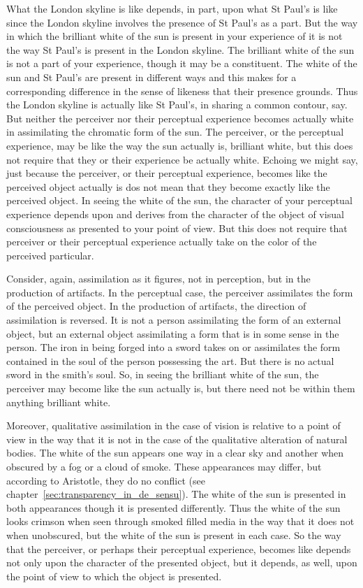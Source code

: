 What the London skyline is like depends, in part, upon what St Paul's is like since the London skyline involves the presence of St Paul's as a part. But the way in which the brilliant white of the sun is present in your experience of it is not the way St Paul's is present in the London skyline. The brilliant white of the sun is not a part of your experience, though it may be a constituent. The white of the sun and St Paul's are present in different ways and this makes for a corresponding difference in the sense of likeness that their presence grounds. Thus the London skyline is actually like St Paul's, in sharing a common contour, say. But neither the perceiver nor their perceptual experience becomes actually white in assimilating the chromatic form of the sun. The perceiver, or the perceptual experience, may be like the way the sun actually is, brilliant white, but this does not require that they or their experience be actually white. Echoing \citet{Austin:1962lr} we might say, just because the perceiver, or their perceptual experience, becomes like the perceived object actually is dos not mean that they become exactly like the perceived object. In seeing the white of the sun, the character of your perceptual experience depends upon and derives from the character of the object of visual consciousness as presented to your point of view. But this does not require that perceiver or their perceptual experience actually take on the color of the perceived particular.

Consider, again, assimilation as it figures, not in perception, but in the production of artifacts. In the perceptual case, the perceiver assimilates the form of the perceived object. In the production of artifacts, the direction of assimilation is reversed. It is not a person assimilating the form of an external object, but an external object assimilating a form that is in some sense in the person. The iron in being forged into a sword takes on or assimilates the form contained in the soul of the person possessing the art.  But there is no actual sword in the smith’s soul. So, in seeing the brilliant white of the sun, the perceiver may become like the sun actually is, but there need not be within them anything brilliant white.

Moreover, qualitative assimilation in the case of vision is relative to a point of view in the way that it is not in the case of the qualitative alteration of natural bodies. The white of the sun appears one way in a clear sky and another when obscured by a fog or a cloud of smoke. These appearances may differ, but according to Aristotle, they do no conflict (see chapter~\ref{sec:transparency_in_de_sensu}). The white of the sun is presented in both appearances though it is presented differently. Thus the white of the sun looks crimson when seen through smoked filled media in the way that it does not when unobscured, but the white of the sun is present in each case. So the way that the perceiver, or perhaps their perceptual experience, becomes like depends not only upon the character of the presented object, but it depends, as well, upon the point of view to which the object is presented.

